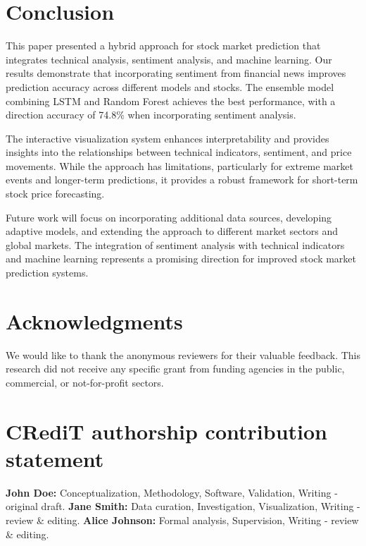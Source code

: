 \documentclass[review]{elsarticle}
\begin{document}
\section{Conclusion}
\label{conclusion}

This paper presented a hybrid approach for stock market prediction that integrates technical analysis, sentiment analysis, and machine learning. Our results demonstrate that incorporating sentiment from financial news improves prediction accuracy across different models and stocks. The ensemble model combining LSTM and Random Forest achieves the best performance, with a direction accuracy of 74.8\% when incorporating sentiment analysis.

The interactive visualization system enhances interpretability and provides insights into the relationships between technical indicators, sentiment, and price movements. While the approach has limitations, particularly for extreme market events and longer-term predictions, it provides a robust framework for short-term stock price forecasting.

Future work will focus on incorporating additional data sources, developing adaptive models, and extending the approach to different market sectors and global markets. The integration of sentiment analysis with technical indicators and machine learning represents a promising direction for improved stock market prediction systems.

\section*{Acknowledgments}
We would like to thank the anonymous reviewers for their valuable feedback. This research did not receive any specific grant from funding agencies in the public, commercial, or not-for-profit sectors.

\section*{CRediT authorship contribution statement}
\textbf{John Doe:} Conceptualization, Methodology, Software, Validation, Writing - original draft.
\textbf{Jane Smith:} Data curation, Investigation, Visualization, Writing - review \& editing.
\textbf{Alice Johnson:} Formal analysis, Supervision, Writing - review \& editing.



\end{document}
